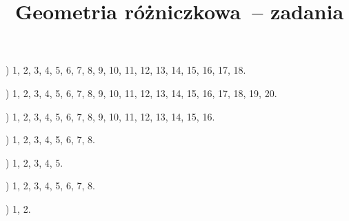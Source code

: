 \documentclass[a4paper,11pt]{article}
\title{Geometria różniczkowa~-- zadania}
\begin{document}





\maketitle %







\noindent
{}) 1, 2, 3, 4, 5, 6, 7, 8, 9, 10, 11, 12, 13, 14, 15,
16, 17, 18.

\vspace{\spaceFour}



\noindent
{}) 1, 2, 3, 4, 5, 6, 7, 8, 9, 10, 11, 12, 13, 14, 15,
16, 17, 18, 19, 20.

\vspace{\spaceFour}



\noindent
{}) 1, 2, 3, 4, 5, 6, 7, 8, 9, 10, 11, 12, 13, 14, 15, 16.

\vspace{\spaceFour}



\noindent
{}) 1, 2, 3, 4, 5, 6, 7, 8.

\vspace{\spaceFour}



\noindent
{}) 1, 2, 3, 4, 5.

\vspace{\spaceFour}



\noindent
{}) 1, 2, 3, 4, 5, 6, 7, 8.

\vspace{\spaceFour}



\noindent
{}) 1, 2.

\vspace{\spaceFour}
\end{document}
